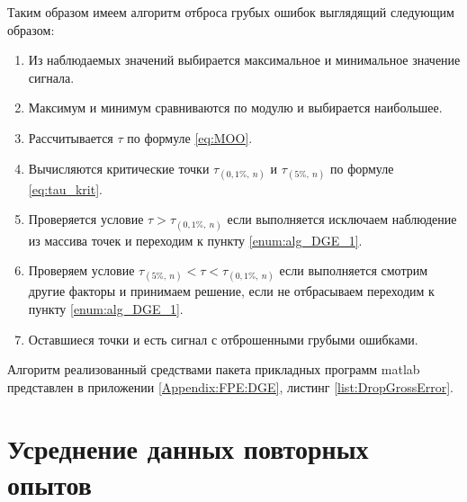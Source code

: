 Таким образом имеем алгоритм отброса грубых ошибок выглядящий следующим образом:
\begin{enumerate}
	\item Из наблюдаемых значений выбирается максимальное и минимальное значение сигнала.\label{enum:alg_DGE_1}
	\item Максимум и минимум сравниваются по модулю и выбирается наибольшее.
	\item Рассчитывается $ \tau $ по формуле \ref{eq:MOO}.
	\item Вычисляются критические точки $ \tau_{(0,1\%,\ n)} $ и $ \tau_{(5\%,\ n)} $ по формуле \ref{eq:tau_krit}.
	\item Проверяется условие $ \tau > \tau_{(0,1\%,\ n)} $ если выполняется исключаем наблюдение из массива точек и переходим к пункту \ref{enum:alg_DGE_1}.
	\item Проверяем условие $ \tau_{(5\%,\ n)} < \tau < \tau_{(0,1\%,\ n)} $ если выполняется смотрим другие факторы и принимаем решение, если не отбрасываем переходим к пункту \ref{enum:alg_DGE_1}.
	\item Оставшиеся точки и есть сигнал с отброшенными грубыми ошибками.
\end{enumerate}

Алгоритм реализованный средствами пакета прикладных программ matlab представлен в приложении \ref{Appendix:FPE:DGE}, листинг \ref{list:DropGrossError}.

%		

\section{Усреднение данных повторных опытов}\label{sect3_3}

